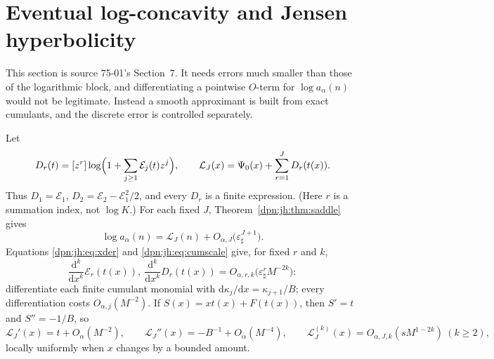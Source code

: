 \documentclass[11pt]{article}
\numberwithin{equation}{section}
\theoremstyle{definition}\newtheorem{definition}[theorem]{Definition}
\theoremstyle{remark}\newtheorem{remark}[theorem]{Remark}
\newcommand{\epsh}{\varepsilon_{\sharp}}
\begin{document}
\section{Eventual log-concavity and Jensen hyperbolicity}\label{dpn:jh:sec:shape}
This section is source 75-01's Section~7.  It needs errors much smaller than
those of the logarithmic block, and differentiating a pointwise $O$-term for
$\log a_\alpha(n)$ would not be legitimate.  Instead a smooth approximant is
built from exact cumulants, and the discrete error is controlled separately.

Let
\begin{equation}\label{dpn:jh:eq:Dr}
 D_r(t)=[z^r]\log\Bigl(1+\sum_{j\ge1}\mathcal E_j(t)z^j\Bigr),\qquad
 \mathcal L_J(x)=\Psi_0(x)+\sum_{r=1}^JD_r(t(x)).
\end{equation}
Thus $D_1=\mathcal E_1$, $D_2=\mathcal E_2-\mathcal E_1^2/2$, and every $D_r$ is
a finite expression.  (Here $r$ is a summation index, not $\log K$.)  For each
fixed $J$, Theorem~\ref{dpn:jh:thm:saddle} gives
\begin{equation}\label{dpn:jh:eq:smootherror}
 \log a_\alpha(n)=\mathcal L_J(n)+O_{\alpha,J}\bigl(\epsh^{J+1}\bigr).
\end{equation}
Equations \eqref{dpn:jh:eq:xder} and \eqref{dpn:jh:eq:cumscale} give, for
fixed $r$ and $k$,
\begin{equation}\label{dpn:jh:eq:Eder}
 \frac{\mathrm d^k}{\mathrm dx^k}\mathcal E_r(t(x)),\
 \frac{\mathrm d^k}{\mathrm dx^k}D_r(t(x))
 =O_{\alpha,r,k}\bigl(\epsh^rM^{-2k}\bigr):
\end{equation}
differentiate each finite cumulant monomial with
$\mathrm d\kappa_j/\mathrm dx=\kappa_{j+1}/B$; every differentiation costs
$O_{\alpha,j}(M^{-2})$.  If $S(x)=xt(x)+F(t(x))$, then $S'=t$ and $S''=-1/B$,
so
\begin{equation}\label{dpn:jh:eq:Lder}
 \mathcal L_J'(x)=t+O_\alpha(M^{-2}),\qquad
 \mathcal L_J''(x)=-B^{-1}+O_\alpha(M^{-4}),\qquad
 \mathcal L_J^{(k)}(x)=O_{\alpha,J,k}(sM^{1-2k})\ (k\ge2),
\end{equation}
locally uniformly when $x$ changes by a bounded amount.
\end{document}
